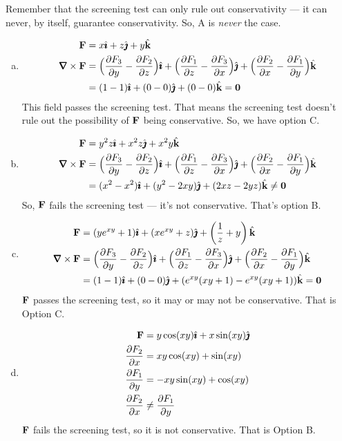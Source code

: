 \begin{solution}
Remember that the screening test can only rule out conservativity --- it can never, by itself, guarantee conservativity. So, A is \emph{never} the case.
\begin{enumerate}[a.]
\item \begin{align*}\vF&=x\hi + z\hj + y\hk\\
\vnabla \times \vF&=\Big(\pdiff{F_3}{y} -\pdiff{F_2}{z} \Big)\hi
+\Big(\pdiff{F_1}{z} -\pdiff{F_3}{x} \Big)\hj
+\Big(\pdiff{F_2}{x} -\pdiff{F_1}{y} \Big)\hk\\
&=(1-1)\hi+(0-0)\hj+(0-0)\hk = \mathbf0
\end{align*}
This field passes the screening test. That means the screening test doesn't rule out the possibility of $\mathbf{F}$ being conservative. So, we have option C.

\item  \begin{align*}\vF&=y^2z\hi + x^2z\hj + x^2y\hk\\
\vnabla \times \vF&=\Big(\pdiff{F_3}{y} -\pdiff{F_2}{z} \Big)\hi
+\Big(\pdiff{F_1}{z} -\pdiff{F_3}{x} \Big)\hj
+\Big(\pdiff{F_2}{x} -\pdiff{F_1}{y} \Big)\hk\\
&=(x^2-x^2)\hi+(y^2-2xy)\hj+(2xz-2yz)\hk \neq \mathbf0
\end{align*}
So, $\mathbf{F}$ fails the screening test --- it's not conservative. That's option B.

\item 
 \begin{align*}\vF&=(ye^{xy}+1)\hi + (xe^{xy}+z)\hj + \left( \frac1z+y\right)\hk\\
\vnabla \times \vF&=\Big(\pdiff{F_3}{y} -\pdiff{F_2}{z} \Big)\hi
+\Big(\pdiff{F_1}{z} -\pdiff{F_3}{x} \Big)\hj
+\Big(\pdiff{F_2}{x} -\pdiff{F_1}{y} \Big)\hk\\
&=(1-1)\hi+(0-0)\hj+(e^{xy}(xy+1)-e^{xy}(xy+1))\hk = \mathbf0
\end{align*}
$\mathbf{F}$ passes the screening test, so it may or may not be conservative. That is Option C.

\item
 \begin{align*}\vF&=y\cos(xy)\hi + x\sin(xy)\hj \\
\pdiff{F_2}{x}&=xy\cos(xy)+\sin(xy)\\
\pdiff{F_1}{y}&=-xy\sin(xy)+\cos(xy)\\
\pdiff{F_2}{x}&\neq \pdiff{F_1}{y}
\end{align*}
$\mathbf{F}$ fails the screening test, so it is not conservative.
That is Option B.

\end{enumerate}
\end{solution}

